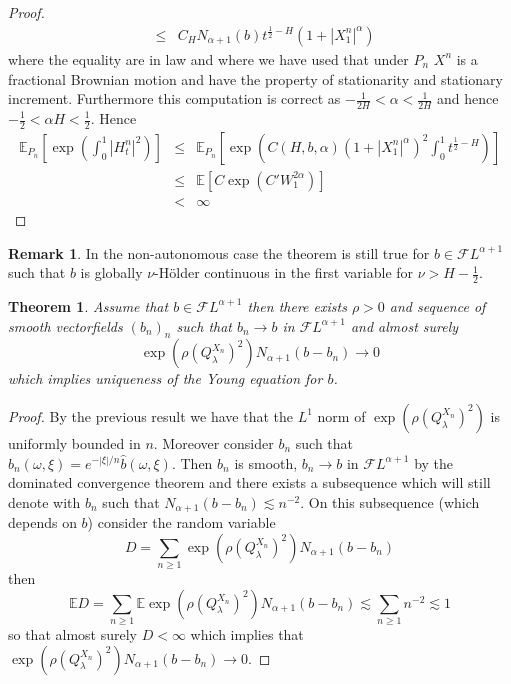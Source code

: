 \documentclass[11pt,a4paper,draft,reqno]{amsart}
\newtheorem{theorem}{Theorem}
\theoremstyle{definition}
\newtheorem{remark}{Remark}
\newcommand{\expect}{\mathbb{E}}
\newcommand{\cF}{\mathcal{F}}
\begin{document}
\begin{proof}
\begin{eqnarray*}
&\le&
C_H N_{\alpha+1}(b)t^{\frac12-H}\left(1 + \left|X^n_1\right|^\alpha\right)
\end{eqnarray*}
where the equality are in law and where we have used that under $P_n$ $X^n$ is a fractional Brownian motion and have the property of stationarity and stationary increment. Furthermore this computation is correct as $-\frac1{2H}<\alpha<\frac1{2H}$ and hence $-\frac12<\alpha H<\frac12$. Hence
\begin{eqnarray*}
\expect_{P_n}\left[\exp\left(\int_{0}^1\left|H_t^n\right|^2\right)\right]
&\le&
\expect_{P_n}\left[\exp\left(C(H,b,\alpha)(1+\left|X^n_1\right|^\alpha)^2\int_{0}^1t^{\frac12-H}\right)\right]\\
&\le&
\expect\left[C\exp\left(C'W_1^{2\alpha}\right)\right]\\
&<&
\infty
\end{eqnarray*}
\qedhere
\end{proof}
\begin{remark}
In the non-autonomous case the theorem is still true for $b\in\cF L^{\alpha+1}$ such that $b$ is globally $\nu$-H\"older continuous in the first variable for $\nu>H-\frac12$.
\end{remark}
\begin{theorem}
Assume that $b\in\cF L^{\alpha+1}$ then there exists $\rho>0$ and sequence of smooth vectorfields $(b_n)_n$ such that $b_n \to b$ in $\cF L^{\alpha+1}$ and almost surely
$$
\exp\left(\rho(Q^{X_n}_\lambda)^2\right) N_{\alpha+1}(b-b_n) \to 0
$$
which implies uniqueness of the Young equation for $b$.
\end{theorem}
\begin{proof}
By the previous result we have that the $L^1$ norm of $\exp(\rho(Q^{X_n}_\lambda)^2)$ is uniformly bounded in $n$. Moreover consider $b_n$ such that 
$
\hat b_n(\omega,\xi) = e^{-|\xi|/n} \hat b(\omega,\xi)
$. Then $b_n$ is smooth, $b_n \to b$ in $\cF L^{\alpha+1}$ by the dominated convergence theorem and there exists a subsequence which will still denote with $b_n$ such that $N_{\alpha+1}(b-b_n)\lesssim n^{-2}$. On this subsequence (which depends on $b$) consider the random variable
$$
D = \sum_{n\ge 1} \exp\left(\rho(Q^{X_n}_\lambda)^2\right) N_{\alpha+1}(b-b_n)
$$
then 
$$
\expect D = \sum_{n\ge 1} \expect \exp\left(\rho(Q^{X_n}_\lambda)^2\right) N_{\alpha+1}(b-b_n) \lesssim \sum_{n\ge 1} n^{-2} \lesssim 1
$$
so that almost surely $D<\infty$ which implies that $\exp\left(\rho(Q^{X_n}_\lambda)^2\right) N_{\alpha+1}(b-b_n) \to 0$. 
\end{proof}
\end{document}
